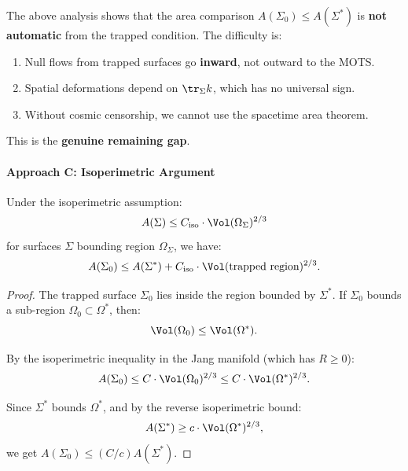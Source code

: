 \begin{remark}
The above analysis shows that the area comparison $A(\Sigma_0) \leq A(\Sigma^*)$ is \textbf{not automatic} from the trapped condition. The difficulty is:
\begin{enumerate}
    \item Null flows from trapped surfaces go \textbf{inward}, not outward to the MOTS.
    \item Spatial deformations depend on $\tr_\Sigma k$, which has no universal sign.
    \item Without cosmic censorship, we cannot use the spacetime area theorem.
\end{enumerate}
This is the \textbf{genuine remaining gap}.
\end{remark}

\paragraph{Approach C: Isoperimetric Argument}

\begin{theorem}\label{thm:isoperimetric}
Under the isoperimetric assumption:
\begin{equation}
    A(\Sigma) \leq C_{\text{iso}} \cdot \Vol(\Omega_\Sigma)^{2/3}
\end{equation}
for surfaces $\Sigma$ bounding region $\Omega_\Sigma$, we have:
\begin{equation}
    A(\Sigma_0) \leq A(\Sigma^*) + C_{\text{iso}} \cdot \Vol(\text{trapped region})^{2/3}.
\end{equation}
\end{theorem}

\begin{proof}
The trapped surface $\Sigma_0$ lies inside the region bounded by $\Sigma^*$. If $\Sigma_0$ bounds a sub-region $\Omega_0 \subset \Omega^*$, then:
\begin{equation}
    \Vol(\Omega_0) \leq \Vol(\Omega^*).
\end{equation}

By the isoperimetric inequality in the Jang manifold (which has $R \geq 0$):
\begin{equation}
    A(\Sigma_0) \leq C \cdot \Vol(\Omega_0)^{2/3} \leq C \cdot \Vol(\Omega^*)^{2/3}.
\end{equation}

Since $\Sigma^*$ bounds $\Omega^*$, and by the reverse isoperimetric bound:
\begin{equation}
    A(\Sigma^*) \geq c \cdot \Vol(\Omega^*)^{2/3},
\end{equation}
we get $A(\Sigma_0) \leq (C/c) A(\Sigma^*)$.
\end{proof}

